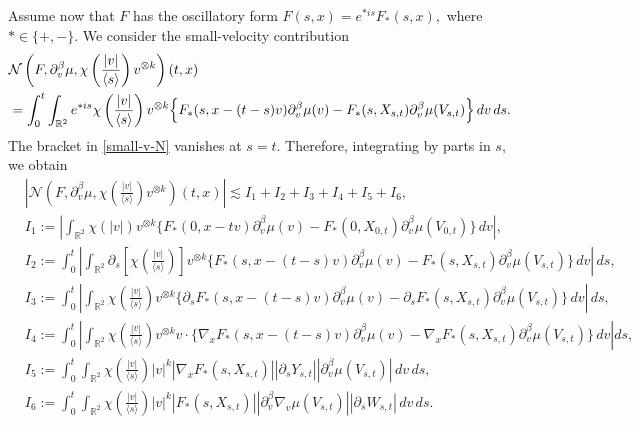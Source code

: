\documentclass[reqno,11pt]{amsart}
\numberwithin{equation}{section}
\begin{document}
	Assume now that $F$ has the oscillatory form
	$F(s,x)=e^{\ast is}F_*(s,x),$
	where $\ast\in\{+,-\}$. We consider the small-velocity contribution
	\begin{align}
		&\mathcal{N}\left(F,\partial_{v}^\beta\mu,\chi\left(\frac{|v|}{\langle s\rangle}\right)v^{\otimes k}\right)(t,x)
		\notag\\
		&=\int_0^t\int_{\mathbb R^2} e^{\ast is}
		\chi\left(\frac{|v|}{\langle s\rangle}\right)
		v^{\otimes k}
		\Big\{
		F_*(s,x-(t-s)v)\partial_v^\beta\mu(v)-F_*(s,X_{s,t})\partial_v^\beta\mu(V_{s,t})
		\Big\}\,dv\,ds.
		\label{small-v-N}
	\end{align}
	The bracket in \eqref{small-v-N} vanishes at $s=t$. Therefore, integrating
	by parts in $s$, we obtain
	\begin{equation}		\label{small-v-decomp}
	\begin{split}
		&\left|\mathcal N\left(F,\partial_v^\beta\mu,
		\chi\left(\frac{|v|}{\langle s\rangle}\right)v^{\otimes k}\right)(t,x)
		\right|\lesssim I_1+I_2+I_3+I_4+I_5+I_6,\\
		&I_1:=\left|
		\int_{\mathbb R^2}
		\chi(|v|)v^{\otimes k}
		\Big\{F_*(0,x-tv)\partial_v^\beta\mu(v)-
		F_*(0,X_{0,t})\partial_v^\beta\mu(V_{0,t})
		\Big\}\,dv\right|,\\
		&I_2:=\int_0^t\left|\int_{\mathbb R^2}\partial_s\left[
		\chi\left(\frac{|v|}{\langle s\rangle}\right)\right]
		v^{\otimes k}\Big\{F_*(s,x-(t-s)v)\partial_v^\beta\mu(v)-F_*(s,X_{s,t})\partial_v^\beta\mu(V_{s,t})
		\Big\}\,dv\right|\,ds,\\
		&I_3:=\int_0^t\left|
		\int_{\mathbb R^2}
		\chi\left(\frac{|v|}{\langle s\rangle}\right)
		v^{\otimes k}\Big\{\partial_sF_*(s,x-(t-s)v)\partial_v^\beta\mu(v)-
		\partial_sF_*(s,X_{s,t})\partial_v^\beta\mu(V_{s,t})\Big\}\,dv\right|\,ds,\\
		&I_4:=\int_0^t\left|\int_{\mathbb R^2}
		\chi\left(\frac{|v|}{\langle s\rangle}\right)v^{\otimes k}v\cdot
		\Big\{\nabla_xF_*(s,x-(t-s)v)\partial_v^\beta\mu(v)-\nabla_xF_*(s,X_{s,t})\partial_v^\beta\mu(V_{s,t})
		\Big\}\,dv\right|ds,\\
		&I_5:=\int_0^t\int_{\mathbb R^2}
		\chi\left(\frac{|v|}{\langle s\rangle}\right)
		|v|^k
		|\nabla_xF_*(s,X_{s,t})|
		|\partial_sY_{s,t}|
		|\partial_v^\beta\mu(V_{s,t})|\,dv\,ds,\\
		&I_6:=\int_0^t\int_{\mathbb R^2}
		\chi\left(\frac{|v|}{\langle s\rangle}\right)|v|^k|F_*(s,X_{s,t})|
		|\partial_v^\beta\nabla_v\mu(V_{s,t})|
		|\partial_sW_{s,t}|\,dv\,ds.
	\end{split}
	\end{equation}
	
\end{document}
